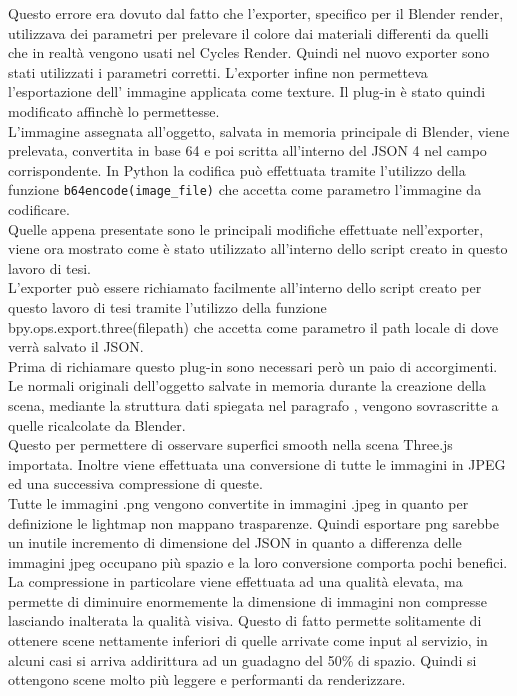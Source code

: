 Questo errore era dovuto dal fatto che l’exporter, specifico per il Blender render, utilizzava dei parametri per prelevare il colore dai materiali differenti da quelli che in realtà vengono usati nel Cycles Render. Quindi nel nuovo exporter sono stati utilizzati i parametri corretti.
L’exporter infine non permetteva l’esportazione dell’ immagine applicata come texture. 
Il plug-in è stato quindi modificato affinchè lo permettesse.
\\
L’immagine assegnata all’oggetto, salvata in memoria principale di Blender, viene prelevata, convertita in base 64  e poi scritta all’interno del JSON 4 nel campo corrispondente.  
In Python la codifica può effettuata tramite l’utilizzo della funzione \texttt{b64encode(image\_file)} che accetta come parametro l’immagine da codificare. 
\\
Quelle appena presentate sono le principali modifiche effettuate nell’exporter, viene ora  mostrato come è stato utilizzato all’interno dello script creato in questo lavoro di tesi. 
\\
L’exporter può essere richiamato facilmente all’interno dello script creato per questo lavoro di tesi tramite l’utilizzo della funzione bpy.ops.export.three(filepath) che accetta come parametro il path locale di dove verrà salvato il JSON.
\\
Prima di richiamare questo plug-in sono necessari però un paio di accorgimenti.
Le normali originali dell’oggetto salvate in memoria durante la creazione della scena, mediante la struttura dati spiegata nel paragrafo \label{sec:chapter_baking_service_pipeline_baking_caricam_scena}, vengono sovrascritte a quelle ricalcolate da Blender. 
\\
Questo per permettere di osservare superfici smooth nella scena Three.js importata.
Inoltre viene effettuata una conversione di tutte le immagini in JPEG ed una successiva compressione di queste.
\\
Tutte le immagini .png vengono convertite in immagini .jpeg in quanto per definizione le lightmap non mappano trasparenze. Quindi esportare png sarebbe un inutile incremento di dimensione del JSON in quanto a differenza delle immagini jpeg occupano più spazio e la loro conversione comporta pochi benefici.
\\
La compressione in particolare  viene effettuata ad una qualità elevata, ma permette di diminuire enormemente la dimensione di immagini non compresse lasciando inalterata la qualità visiva.
Questo di fatto permette solitamente di ottenere scene nettamente inferiori di quelle arrivate come input al servizio, in alcuni casi si arriva addirittura ad un guadagno del 50\% di spazio. Quindi si ottengono scene molto più leggere e performanti da renderizzare.
